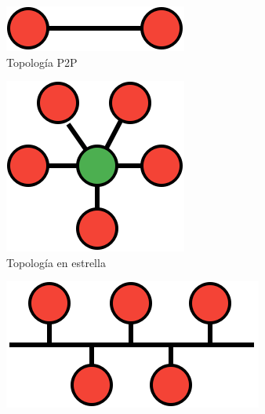 \documentclass[a4paper, 11pt]{report} %
\begin{document}
\begin{figure}[H]
\centering
\begin{subfigure}[p]{0.24\textwidth}
\includegraphics[width=\textwidth]{Resources/Top/P2P.png}
\caption{Topología P2P}
\end{subfigure}
\begin{subfigure}[p]{0.24\textwidth}
\includegraphics[width=\textwidth]{Resources/Top/Estrella.png}
\caption{Topología en estrella}
\end{subfigure}
\begin{subfigure}[p]{0.24\textwidth}
\includegraphics[width=\textwidth]{Resources/Top/BUS.png}

\end{subfigure}
\end{figure}
\end{document}
